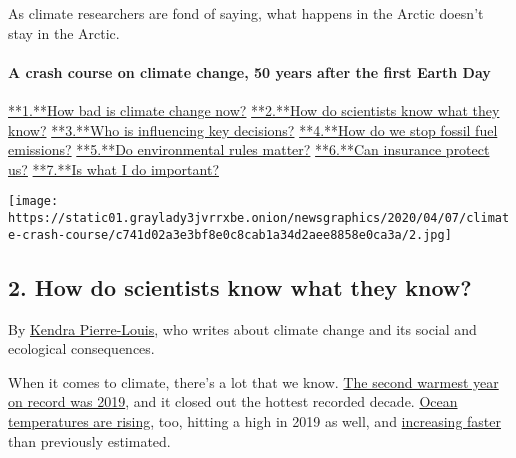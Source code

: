 As climate researchers are fond of saying, what happens in the Arctic
doesn't stay in the Arctic.

\hypertarget{a-crash-course-on-climate-change-50-years-after-the-first-earth-day-1}{%
\paragraph{A crash course on climate change, 50 years after the first
Earth
Day}\label{a-crash-course-on-climate-change-50-years-after-the-first-earth-day-1}}

\href{/interactive/2020/04/19/climate/climate-crash-course-1.html}{**1.**How
bad is climate change now?}
\href{/interactive/2020/04/19/climate/climate-crash-course-2.html}{**2.**How
do scientists know what they know?}
\href{/interactive/2020/04/19/climate/climate-crash-course-3.html}{**3.**Who
is influencing key decisions?}
\href{/interactive/2020/04/19/climate/climate-crash-course-4.html}{**4.**How
do we stop fossil fuel emissions?}
\href{/interactive/2020/04/19/climate/climate-crash-course-5.html}{**5.**Do
environmental rules matter?}
\href{/interactive/2020/04/19/climate/climate-crash-course-6.html}{**6.**Can
insurance protect us?}
\href{/interactive/2020/04/19/climate/climate-crash-course-7.html}{**7.**Is
what I do important?}

\texttt{[image: https://static01.graylady3jvrrxbe.onion/newsgraphics/2020/04/07/climate-crash-course/c741d02a3e3bf8e0c8cab1a34d2aee8858e0ca3a/2.jpg]}

\hypertarget{2-how-do-scientists-know-what-they-know}{%
\subsection{\texorpdfstring{\textbf{2.} How do scientists know what they
know?}{2. How do scientists know what they know?}}\label{2-how-do-scientists-know-what-they-know}}

By
\href{https://www.nytimes3xbfgragh.onion/by/kendra-pierre-louis}{Kendra
Pierre-Louis}, who writes about climate change and its social and
ecological consequences.

When it comes to climate, there's a lot that we know.
\href{https://www.nytimes3xbfgragh.onion/2020/01/08/climate/2019-temperatures.html}{The
second warmest year on record was 2019}, and it closed out the hottest
recorded decade.
\href{https://www.nytimes3xbfgragh.onion/2020/01/13/climate/ocean-temperatures-climate-change.html}{Ocean
temperatures are rising}, too, hitting a high in 2019 as well, and
\href{https://www.nytimes3xbfgragh.onion/2019/01/10/climate/ocean-warming-climate-change.html}{increasing
faster} than previously estimated.

